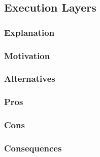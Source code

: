\subsection{Execution Layers}
\subsubsection{Explanation}

\subsubsection{Motivation}

\subsubsection{Alternatives}

\subsubsection{Pros}

\subsubsection{Cons}

\subsubsection{Consequences}
